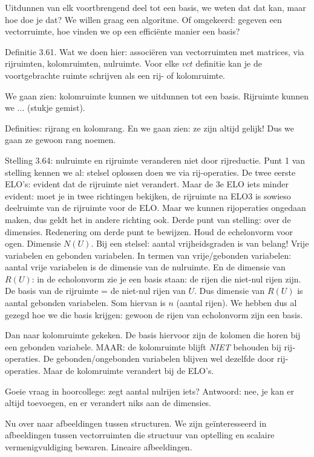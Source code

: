 \documentclass{article}
\begin{document}
Uitdunnen van elk voortbrengend deel tot een basis, we weten dat dat kan, maar hoe doe je dat? We willen graag een algoritme. Of omgekeerd: gegeven een vectorruimte, hoe vinden we op een effici\"ente manier een basis? 

Definitie 3.61. Wat we doen hier: associ\"eren van vectorruimten met matrices, via rijruimten, kolomruimten, nulruimte. 
Voor elke $vct$ definitie kan je de voortgebrachte ruimte schrijven als een rij- of kolomruimte. 

We gaan zien: kolomruimte kunnen we uitdunnen tot een basis. Rijruimte kunnen we ... (stukje gemist). 

Definities: rijrang en kolomrang. En we gaan zien: ze zijn altijd gelijk! Dus we gaan ze gewoon rang noemen. 


Stelling 3.64: nulruimte en rijruimte veranderen niet door rijreductie. Punt 1 van stelling kennen we al: stelsel oplossen doen we via rij-operaties. De twee eerste ELO's: evident dat de rijruimte niet verandert. Maar de 3e ELO iets minder evident: moet je in twee richtingen bekijken, de rijruimte na ELO3 is sowieso deelruimte van de rijruimte voor de ELO. Maar we kunnen rijoperaties ongedaan maken, dus geldt het in andere richting ook. 
Derde punt van stelling: over de dimensies. 
Redenering om derde punt te bewijzen. Houd de echelonvorm voor ogen. Dimensie $N(U)$. Bij een stelsel: aantal vrijheidsgraden is van belang! Vrije variabelen en gebonden variabelen. In termen van vrije/gebonden variabelen: aantal vrije variabelen is de dimensie van de nulruimte. En de dimensie van $R(U)$: in de echolonvorm zie je een basis staan: de rijen die niet-nul rijen zijn. De basis van de rijruimte = de niet-nul rijen van $U$. Dus 
dimensie van $R(U)$ is aantal gebonden variabelen. Som hiervan is $n$ (aantal rijen). We hebben dus al gezegd hoe we die basis krijgen: gewoon de rijen van echolonvorm zijn een basis. 

Dan naar kolomruimte gekeken. De basis hiervoor zijn de kolomen die horen bij een gebonden variabele. MAAR: de kolomruimte blijft \emph{NIET} behouden bij rij-operaties. De gebonden/ongebonden variabelen blijven wel dezelfde door rij-operaties. Maar de kolomruimte verandert bij de ELO's. 

Goeie vraag in hoorcollege: zegt aantal nulrijen iets? Antwoord: nee, je kan er altijd toevoegen, en er verandert niks aan de dimensies. 

Nu over naar afbeeldingen tussen structuren. We zijn ge\"interesseerd in afbeeldingen tussen vectorruimten die structuur van optelling en scalaire vermenigvuldiging bewaren. Lineaire afbeeldingen. 
\end{document}
